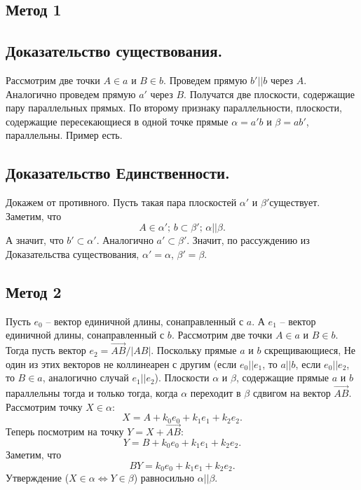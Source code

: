 \subsection*{Метод 1}
\subsection*{Доказательство существования.}
Рассмотрим две точки $A\in a$ и $B\in b$. Проведем прямую $b'||b$ через $A$. Аналогично проведем прямую $a'$ через $B$. Получатся две плоскости, содержащие пару параллельных прямых. По второму признаку параллельности, плоскости, содержащие пересекающиеся в одной точке прямые $\alpha=a'b$ и $\beta=ab'$, параллельны. Пример есть.
\subsection*{Доказательство Единственности.}
Докажем от противного. Пусть такая пара плоскостей $\alpha'$ и $\beta'$существует. Заметим, что
\begin{equation}
	A\in\alpha';\, b\subset\beta';\, \alpha||\beta.
\end{equation}
А значит, что $b'\subset \alpha'$. Аналогично $a'\subset\beta'$. Значит, по рассуждению из Доказательства существования, $\alpha'=\alpha$, $\beta'=\beta$.

\newpage

\subsection*{Метод 2}
Пусть $e_0$ -- вектор единичной длины, сонаправленный с $a$. А $e_1$ -- вектор единичной длины, сонаправленный с $b$. Рассмотрим две точки $A\in a$ и $B\in b$. Тогда пусть вектор $e_2=\overrightarrow{AB}/|AB|$. Поскольку прямые $a$ и $b$ скрещивающиеся, Не один из этих векторов не коллинеарен с другим (если $e_0||e_1$, то $a||b$, если $e_0||e_2$, то $B\in a$, аналогично случай $e_1||e_2$). Плоскости $\alpha$ и $\beta$, содержащие прямые $a$ и $b$ параллельны тогда и только тогда, когда $\alpha$ переходит в $\beta$ сдвигом на вектор $\overrightarrow{AB}$. Рассмотрим точку $X\in\alpha$:
\begin{equation}
	X=A + k_0e_0 + k_1e_1 + k_2e_2.
\end{equation}
Теперь посмотрим на точку $Y=X+\overrightarrow{AB}$:
\begin{equation}
	Y=B + k_0e_0 + k_1e_1 + k_2e_2.
\end{equation}
Заметим, что 
\begin{equation}
	BY=k_0e_0 + k_1e_1 + k_2e_2.
\end{equation}
Утверждение ($X\in\alpha\Leftrightarrow Y\in\beta$) равносильно $\alpha||\beta$.

